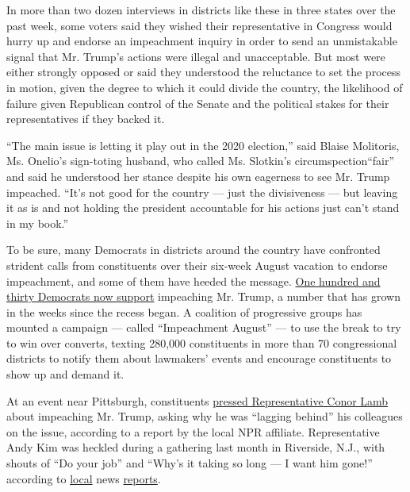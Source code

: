 In more than two dozen interviews in districts like these in three
states over the past week, some voters said they wished their
representative in Congress would hurry up and endorse an impeachment
inquiry in order to send an unmistakable signal that Mr. Trump's actions
were illegal and unacceptable. But most were either strongly opposed or
said they understood the reluctance to set the process in motion, given
the degree to which it could divide the country, the likelihood of
failure given Republican control of the Senate and the political stakes
for their representatives if they backed it.

``The main issue is letting it play out in the 2020 election,'' said
Blaise Molitoris, Ms. Onelio's sign-toting husband, who called Ms.
Slotkin's circumspection``fair'' and said he understood her stance
despite his own eagerness to see Mr. Trump impeached. ``It's not good
for the country --- just the divisiveness --- but leaving it as is and
not holding the president accountable for his actions just can't stand
in my book.''

To be sure, many Democrats in districts around the country have
confronted strident calls from constituents over their six-week August
vacation to endorse impeachment, and some of them have heeded the
message.
\href{https://www.nytimes3xbfgragh.onion/interactive/2019/05/31/us/politics/trump-impeachment-congress-list.html}{One
hundred and thirty Democrats now support} impeaching Mr. Trump, a number
that has grown in the weeks since the recess began. A coalition of
progressive groups has mounted a campaign --- called ``Impeachment
August'' --- to use the break to try to win over converts, texting
280,000 constituents in more than 70 congressional districts to notify
them about lawmakers' events and encourage constituents to show up and
demand it.

At an event near Pittsburgh, constituents
\href{https://www.wesa.fm/post/constituents-press-lamb-impeachment-gun-control-town-hall\#stream/0}{pressed
Representative Conor Lamb} about impeaching Mr. Trump, asking why he was
``lagging behind'' his colleagues on the issue, according to a report by
the local NPR affiliate. Representative Andy Kim was heckled during a
gathering last month in Riverside, N.J., with shouts of ``Do your job''
and ``Why's it taking so long --- I want him gone!'' according to
\href{https://www.burlingtoncountytimes.com/news/20190731/constituents-push-for-trump-impeachment-at-rep-andy-kim-town-hall}{local}
news
\href{https://www.inquirer.com/politics/new-jersey/andy-kim-town-hall-impeachment-economy-trump-climate-guns-20190815.html}{reports}.


